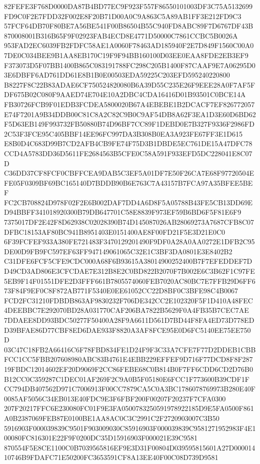 \documentclass[UTF8,fontset=fandol,zihao=-4,a4paper]{ctexart}
\begin{document}
{{82FEFE3F768D0000DA87B4BD77EC9F923F557F86550101003DF3C75A5132699FD9C0F2E7FDD32F002E8F20B71D00A0C9A863C5A89AB1FF3E212FD9C3
57FCF64DB70F80BE7A56BE541F00B86504B55C940FD8ABC89F7D6767DF43B870008001B316B65F9F02923FAB4ECD8E4771D50000C7861CCBC5B0026A
953FAD2EC6039FB2FDFC58AE1A0060F78463AD185940F2E7D849F1560C00A07DE0C034BEE9B1AA8EB170C19F9F94BB160100D03EE0EAA8FDE2EB3EF9
F373073D5F07BB1400B865C083191788FC298C205B1400F87CAAF9E7A06295D03E6DBFF6AD761DD61E8B1B0E00503EDA59225C203EFD595240220800
B8227F8C22B83ADAE6CF750524820080B6A39D55C235E26F9EEE28A0F7AF5FDF675B02C080F9AAED74E704E10A2DBC4CDA16416D01B93501C0BCE14A
FB30726FCB9F01EDB3FCDEA5800020B67A4EBEBE1B2DCACF7EF826772057E74F7201A9B34DDB00C81C8A2C82C9B0C9AF54DB8A62F3EA1D3E60D6BD62
F5D63EB149F993732FB50880B74D96BF7CC89F1DEBD0E7B327F9336F2986FD2C53F3FCE95C405BBF14EE96FC997DA3B308B0EA3A923FE67FF3E1D615
E8B0D4C683D99B7CD2AFB4CB9FE74F75D3B1DBDE5EC761DE15A47DFC78CCD4A5783DD36D5611FE2684563B5CFE0C58A591F933EFD5DC228041E8C07D
C36DD37CF8FCF0CBFFCEA9DAB5C3EF5A01DF7E50F26CA7E68F97720504EFE05F0309BF69BC165140D7BDDB90B6E763C7A43157B7FCA97A35BFEE5BEF
FC2CB708824D978F02F2E6B002DAF7DD4A6D8F5A05788B43FE5CB13DD69ED94BBFF341018920300B79DB647701C58E8839F973EF59B6BD6F5F81E6F9
7375017DF2E42F8D62938C02028390B74D145087026AB28069273A7687CFB8C07DFBC18153AF80BC941B8951403E0151400AE8F00FD21F5E3D21E0C0
6F39FCFEF933A380FE721483F3470129201490F9DF0A28A0AA0272E1DFB2C95DE00D9FB9FC597EF63FF947149061065C32E1C3BF3DA0801E3E8402B2
C31DFE6FCF5CFE9CDC000A68F6B93615A38014900252400B7F7EFEDDEF7DD49CD3AD806E3CFCDAE7E312B8E2C0BD822B2070F7B002E6C3B62F1C97FE
5EB9F14F01551DFE2D3FFF661B7805574060FEB7020AC80BC7E7FFB29D6FF673F84F9EF0C8F872AB771F5340E0EE61052CC22D8BF0C3BFE98C4B0067
FCD2FC31210FDBDB863AF9830232F706DE342CC2E102320F5F1D410A48FEC4DEEBBC7E292070BD28A031770CAF206BA7822B5629F0A4FB35B7CEC7AE
7DDAEE8DD93BDC50277F50400A28F9A6611D561D7BD44F8FA4ED73D778EDD39BFAE86D77CBF8ED6DAE933F8820A3AF8FCE95E0D6FC5140EE75EE750D
03C47C18FB2A66416C6F78FBD834FE1D24F9F3C33A7CFE7F77D2DDEB1CBBFCC1CC5FBB207608980ABC83B4761E4EBB229EFFEF9D716F77DCD8F8F287
19FBDC12014602EF20D9069F2CC86FEBE68C0B814B0F7FF6CDD6CD2D76B0B12CC0C359287C1DEC01AF269F2C9A0B5F05180E6FCC1F773600B39CDF1F
CC794DB407562D971C7006913F00CC7879CA5C0A3BC1786078769973B280E40F0085AF5056C34EB013E40FDC9E3F6FBF200F00207F20237F7CFA0300
207F20217FFC6E230080FC01F9E3FA0500783250591978922185D9E5FA0500F861A0B2387069FEB87E0100BE1AA8AC0C3C2991C2F2720903007C3B50
5916903F000039839C9501F903009030C85916903F000039839C9581271952983F4E100080FC816301E22F9F0200DC35D15916903F000021E39C9581
870554F5E8CE1100C0B7039565816EF9E3D31F00804D039595815601A27D00001410746B9FDAFC71E50200FC3653591CF8A13EE40F00C08D739D9581
}}
\end{document}
